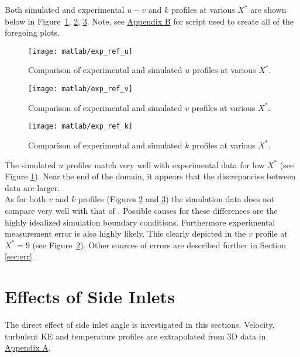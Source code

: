 Both simulated and experimental $u-v$ and $k$ profiles at various $X^*$ are shown below in Figure~\ref{fig:exp_ref_u}, \ref{fig:exp_ref_v}, \ref{fig:exp_ref_k}. Note, see \hyperlink{appendixb}{Appendix B} for \cite{matlab} script used to create all of the foregoing plots.\\
\begin{figure}[H]
	\centering
	\texttt{[image: matlab/exp\_ref\_u]}
	\caption{Comparison of experimental and simulated $u$ profiles at various $X^*$.}
	\label{fig:exp_ref_u}
\end{figure}

\begin{figure}[H]
	\centering
	\texttt{[image: matlab/exp\_ref\_v]}
	\caption{Comparison of experimental and simulated $v$ profiles at various $X^*$.}
	\label{fig:exp_ref_v}
\end{figure}

\begin{figure}[H]
	\centering
	\texttt{[image: matlab/exp\_ref\_k]}
	\caption{Comparison of experimental and simulated $k$ profiles at various $X^*$.}
	\label{fig:exp_ref_k}
\end{figure}

The simulated $u$ profiles match very well with experimental data for low $X^*$ (see Figure  \ref{fig:exp_ref_u}). Near the end of the domain, it appears that the discrepancies between data are larger.\\

As for both $v$ and $k$ profiles (Figures \ref{fig:exp_ref_v} and \ref{fig:exp_ref_k}) the simulation data does not compare very well with that of \cite{art}. Possible causes for these differences are the highly idealized simulation boundary conditions. Furthermore experimental measurement error is also highly likely. This clearly depicted in the $v$ profile at $X^*=9$ (see Figure~\ref{fig:exp_ref_v}). Other sources of errors are described further in Section \ref{sec:err}.
\section{Effects of Side Inlets}
\label{sec:effects_side}
The direct effect of side inlet angle is investigated in this sections. Velocity, turbulent KE and temperature profiles are extrapolated from 3D data in \hyperlink{appendixa}{Appendix A}.\\

